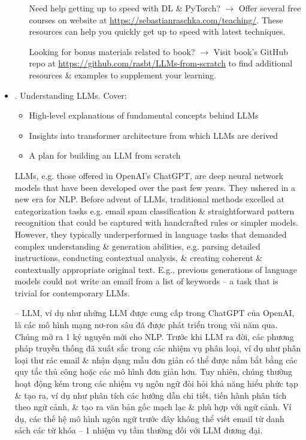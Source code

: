 \documentclass{article}
\begin{document}
\begin{itemize}
\begin{itemize}
		Need help getting up to speed with DL \& PyTorch? $\to$ Offer several free courses on website at \url{https://sebastianraschka.com/teaching/}. These resources can help you quickly get up to speed with latest techniques.
		
		Looking for bonus materials related to book? $\to$ Visit book's GitHub repo at \url{https://github.com/rasbt/LLMs-from-scratch} to find additional resources \& examples to supplement your learning.		
	\end{itemize}
	\item {. Understanding LLMs.} Cover:
	\begin{itemize}
		\item High-level explanations of fundamental concepts behind LLMs
		\item Insights into transformer architecture from which LLMs are derived
		\item A plan for building an LLM from scratch
	\end{itemize}
	LLMs, e.g. those offered in OpenAI's ChatGPT, are deep neural network models that have been developed over the past few years. They ushered in a new era for NLP. Before advent of LLMs, traditional methods excelled at categorization tasks e.g. email spam classification \& straightforward pattern recognition that could be captured with handcrafted rules or simpler models. However, they typically underperformed in language tasks that demanded complex understanding \& generation abilities, e.g. parsing detailed instructions, conducting contextual analysis, \& creating coherent \& contextually appropriate original text. E.g., previous generations of language models could not write an email from a list of keywords -- a task that is trivial for contemporary LLMs.
	
	-- LLM, ví dụ như những LLM được cung cấp trong ChatGPT của OpenAI, là các mô hình mạng nơ-ron sâu đã được phát triển trong vài năm qua. Chúng mở ra 1  kỷ nguyên mới cho NLP. Trước khi LLM ra đời, các phương pháp truyền thống đã xuất sắc trong các nhiệm vụ phân loại, ví dụ như phân loại thư rác email \& nhận dạng mẫu đơn giản có thể được nắm bắt bằng các quy tắc thủ công hoặc các mô hình đơn giản hơn. Tuy nhiên, chúng thường hoạt động kém trong các nhiệm vụ ngôn ngữ đòi hỏi khả năng hiểu phức tạp \& tạo ra, ví dụ như phân tích các hướng dẫn chi tiết, tiến hành phân tích theo ngữ cảnh, \& tạo ra văn bản gốc mạch lạc \& phù hợp với ngữ cảnh. Ví dụ, các thế hệ mô hình ngôn ngữ trước đây không thể viết email từ danh sách các từ khóa -- 1  nhiệm vụ tầm thường đối với LLM đương đại.
	

\end{itemize}
\end{document}
